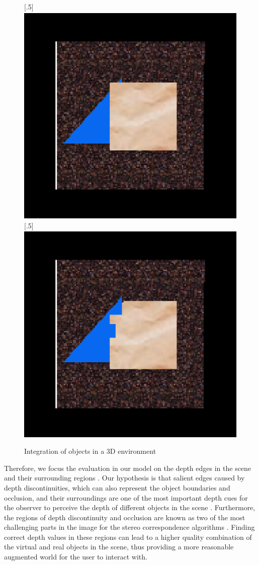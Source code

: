 \begin{figure}[h!]
\centering
{}
[.5\linewidth]{\includegraphics[scale=1.1]{ARaccurate}}%
[.5\linewidth]{\includegraphics[scale=1.1]{ARdist}}%
\caption{Integration of objects in a 3D environment}
\label{fig:ARreg}
\end{figure}

Therefore, we focus the evaluation in our model
on the depth edges in the scene and their surrounding regions \cite{liv05,kru10}.
Our hypothesis is that salient edges caused by depth discontinuities, which can also represent the object boundaries and occlusion, and their surroundings
are one of the most important depth cues for the observer 
to perceive the depth of different objects in the scene \cite{sze11}. 
Furthermore, the regions of depth discontinuity and occlusion are known as two of the most challenging parts in the image
for the stereo correspondence algorithms \cite{sch02}.
Finding correct depth values in these 
regions can lead to a higher quality combination of the virtual and real objects in the scene, thus providing a more reasonable augmented world 
for the user to interact with.

